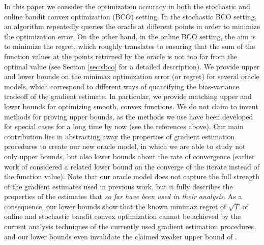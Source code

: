 In this paper we consider the optimization accuracy in both the stochastic and online bandit convex optimization (BCO) setting.
In the stochastic BCO setting, an algorithm repeatedly queries the oracle at different points in order to minimize the optimization error. On the other hand, in the online BCO setting, the aim is to minimize the regret, which roughly translates to ensuring that the sum of the function values at the points returned by the oracle is not too far from the optimal value (see Section \ref{sec:sbco} for a detailed description).
We  provide upper and lower bounds on the minimax optimization error (or regret) for several oracle models, which correspond to different ways of quantifying the bias-variance tradeoff of the gradient estimate. In particular, we provide matching upper and lower bounds for optimizing smooth, convex functions. We do not claim to invent methods for proving upper bounds, as the methods we use have been developed for special cases for a long time by now (see the references above).
Our main contribution lies in abstracting away the properties of gradient estimation procedures
to create our new oracle model, in which we are able to study not only upper bounds, but also lower bounds about the rate of convergence
(earlier work of \citet{Chen88:LB-AoS} considered a related lower bound on the converge of the iterate instead of the function value).
Note that our oracle model does not capture the full strength of the gradient estimates used in previous work, but it fully describes the properties of the estimates that \emph{so far have been used in their analysis}.
As a consequence, our lower bounds show that the known minimax regret of $\sqrt{T}$ \citep{BubeckDKP15,BuEl15}
of online and stochastic bandit convex optimization cannot be achieved by the current analysis techniques of the currently used gradient estimation procedures, and our lower bounds even invalidate the claimed weaker upper bound of \cite{DeElKo15}.


